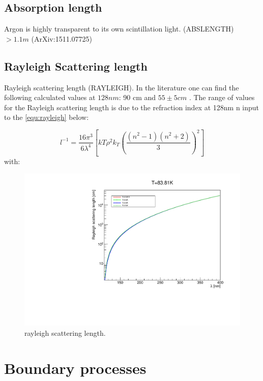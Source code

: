 \documentclass[a4paper]{jpconf}
\begin{document}
\subsection{Absorption length}
Argon is highly transparent to its own scintillation light. (ABSLENGTH)
  $> 1.1 m$  (ArXiv:1511.07725) 
  \subsection{Rayleigh Scattering length}
  Rayleigh scattering length (RAYLEIGH). In the literature one can find the following calculated values at $128 nm$:  90 cm \cite{ref:vg}
  and $55\pm  5 cm$ \cite{ref:grace}. The  range of values for the Rayleigh
scattering length is due to the refraction index at 128nm  n input  to the \ref{equ:rayleigh} below:

  \begin{equation}
l^{-1} = \frac{16\pi^3}{6\lambda^4} \left[ kT \rho^2 k_T \left( \frac{(n^2 - 1)(n^2 + 2)}{3} \right)^2\right]
  \label{equ:rayleigh}
\end{equation}
\noindent
    with:\\


  
  \begin{figure}[ht]
    \begin{center}
      \includegraphics[width=35.5pc]{rayleigh.pdf}
    \end{center}
    \caption{\label{fig:rayleigh}rayleigh scattering length.}
  \end{figure}
  \section{Boundary processes}
\end{document}
